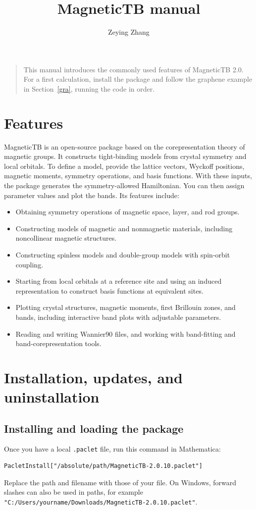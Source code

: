 \documentclass[titlepage,a4paper,12pt]{article}
\begin{document}
\title{\textsf{MagneticTB} manual}
\author{Zeying Zhang}
\maketitle
\tableofcontents

\begin{quote}
\small
This manual introduces the commonly used features of \textsf{MagneticTB} 2.0.
For a first calculation, install the package and follow the graphene example
in Section~\ref{gra}, running the code in order.
\end{quote}
\newpage

\section{Features}
\textsf{MagneticTB} is an open-source package based on the corepresentation theory
of magnetic groups. It constructs tight-binding models from crystal symmetry
and local orbitals. To define a model, provide the lattice vectors, Wyckoff
positions, magnetic moments, symmetry operations, and basis functions.
With these inputs, the package generates the symmetry-allowed Hamiltonian.
You can then assign parameter values and plot the bands. Its features include:
\begin{itemize}
\item Obtaining symmetry operations of magnetic space, layer, and rod groups.
\item Constructing models of magnetic and nonmagnetic materials, including
noncollinear magnetic structures.
\item Constructing spinless models and double-group models with spin-orbit coupling.
\item Starting from local orbitals at a reference site and using an induced
representation to construct basis functions at equivalent sites.
\item Plotting crystal structures, magnetic moments, first Brillouin zones, and
bands, including interactive band plots with adjustable parameters.
\item Reading and writing Wannier90 files, and working with band-fitting and
band-corepresentation tools.
\end{itemize}

\section{Installation, updates, and uninstallation}
\subsection{Installing and loading the package}
Once you have a local \lstinline|.paclet| file, run this command in Mathematica:
\begin{lstlisting}[numbers=none]
PacletInstall["/absolute/path/MagneticTB-2.0.10.paclet"]
\end{lstlisting}
Replace the path and filename with those of your file. On Windows, forward
slashes can also be used in paths, for example
\lstinline|"C:/Users/yourname/Downloads/MagneticTB-2.0.10.paclet"|.
\end{document}
